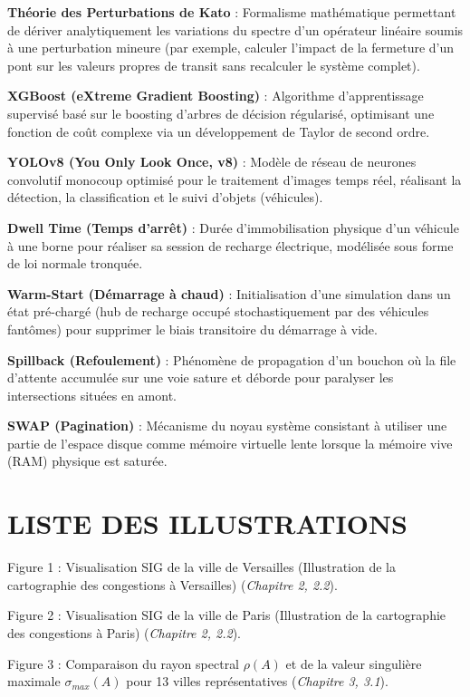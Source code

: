 \documentclass[10pt, a4paper]{article}
\begin{document}
\textbf{Théorie des Perturbations de Kato} : Formalisme mathématique
permettant de dériver analytiquement les variations du spectre d'un
opérateur linéaire soumis à une perturbation mineure (par exemple,
calculer l'impact de la fermeture d'un pont sur les valeurs propres de
transit sans recalculer le système complet).

\textbf{XGBoost (eXtreme Gradient Boosting)} : Algorithme
d'apprentissage supervisé basé sur le boosting d'arbres de décision
régularisé, optimisant une fonction de coût complexe via un
développement de Taylor de second ordre.

\textbf{YOLOv8 (You Only Look Once, v8)} : Modèle de réseau de neurones
convolutif monocoup optimisé pour le traitement d'images temps réel,
réalisant la détection, la classification et le suivi d'objets
(véhicules).

\textbf{Dwell Time (Temps d'arrêt)} : Durée d'immobilisation physique
d'un véhicule à une borne pour réaliser sa session de recharge
électrique, modélisée sous forme de loi normale tronquée.

\textbf{Warm-Start (Démarrage à chaud)} : Initialisation d'une
simulation dans un état pré-chargé (hub de recharge occupé
stochastiquement par des véhicules fantômes) pour supprimer le biais
transitoire du démarrage à vide.

\textbf{Spillback (Refoulement)} : Phénomène de propagation d'un bouchon
où la file d'attente accumulée sur une voie sature et déborde pour
paralyser les intersections situées en amont.

\textbf{SWAP (Pagination)} : Mécanisme du noyau système consistant à
utiliser une partie de l'espace disque comme mémoire virtuelle lente
lorsque la mémoire vive (RAM) physique est saturée.

\newpage

\section{LISTE DES ILLUSTRATIONS}\label{liste-des-illustrations}

Figure 1 : Visualisation SIG de la ville de Versailles (Illustration de
la cartographie des congestions à Versailles) (\emph{Chapitre 2, 2.2}).

Figure 2 : Visualisation SIG de la ville de Paris (Illustration de la
cartographie des congestions à Paris) (\emph{Chapitre 2, 2.2}).

Figure 3 : Comparaison du rayon spectral \(\rho(A)\) et de la valeur
singulière maximale \(\sigma_{max}(A)\) pour 13 villes représentatives
(\emph{Chapitre 3, 3.1}).
\end{document}
